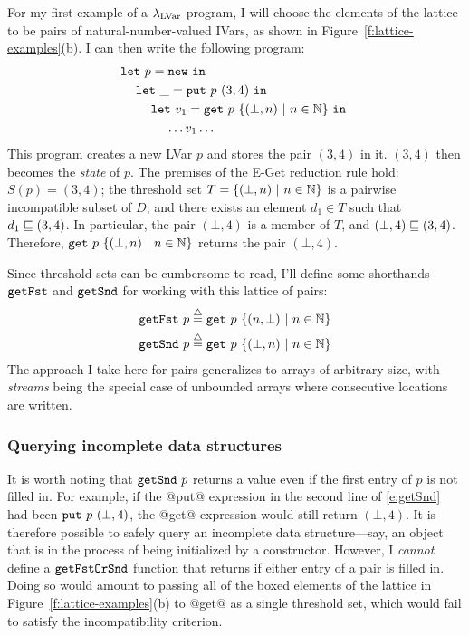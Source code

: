 For my first example of a $\lambda_{\textrm{LVar}}$ program, I will choose the
elements of the lattice to be pairs of natural-number-valued IVars, as
shown in Figure~\ref{f:lattice-examples}(b).  I can then write the
following program:
\begin{equation}
\begin{split}
& \letexp{p}{\NEW}{ \\
& \letspace \letexp{\_}{\putexp{p}{(3,4)}}{ \\
& \letspace \letspace \letexp{v_1}{\getexp{p}{\stateset{(\bot, n) \setsep n \in \mathbb{N}}}}{ \\
& \letspace \letspace \letspace \dots v_1 \dots}}}
\end{split}
\label{e:getSnd}
\end{equation}
This program creates a new LVar $p$ and stores the pair $(3, 4)$ in
it.  $(3,4)$ then becomes the \emph{state} of $p$.  The premises of
the {\sc E-Get} reduction rule hold: $S(p) = (3,4)$; the threshold
set $T = \lbrace (\bot, n) \ | \  n \in \mathbb{N} \rbrace$ is a pairwise
incompatible subset of $D$; and there exists an element $d_1 \in T$
such that $d_1 \sqsubseteq (3,4)$.  In particular, the pair $(\bot, 4)$
is a member of $T$, and $(\bot,4) \sqsubseteq (3,4)$.  Therefore,
$\mbox{\texttt{get}}~p~\lbrace (\bot, n) \ | \  n \in \mathbb{N} \rbrace$ returns
the pair $(\bot,4)$.

Since threshold sets can be cumbersome to read, I'll define some
shorthands $\mbox{\texttt{getFst}}$ and $\mbox{\texttt{getSnd}}$ for working with this lattice of
pairs:
\begin{align*}
\mbox{\texttt{getFst}}~p \stackrel{\triangle}{=} \mbox{\texttt{get}}~p~\lbrace (n, \bot) \ | \  n \in
    \mathbb{N} \rbrace \\
\mbox{\texttt{getSnd}}~p \stackrel{\triangle}{=} \mbox{\texttt{get}}~p~\lbrace (\bot, n) \ | \  n \in
    \mathbb{N} \rbrace
\end{align*}
The approach I take here for pairs generalizes to arrays of arbitrary
size, with \emph{streams} being the special case of unbounded arrays
where consecutive locations are written.

\subsubsection{Querying incomplete data structures}

It is worth noting that $\mbox{\texttt{getSnd}}~p$ returns a value even if the
first entry of $p$ is not filled in.  For example, if the @put@
expression in the second line of \eqref{e:getSnd} had been
$\mbox{\texttt{put}}~p~(\bot,4)$, the @get@ expression would still return
$(\bot,4)$.  It is therefore possible to safely query an incomplete
data structure---say, an object that is in the process of being
initialized by a constructor.  However, I \emph{cannot} define a
$\mbox{\texttt{getFstOrSnd}}$ function that returns if either entry of a pair is
filled in.  Doing so would amount to passing all of the boxed elements
of the lattice in Figure~\ref{f:lattice-examples}(b) to @get@ as a
single threshold set, which would fail to satisfy the incompatibility
criterion.

